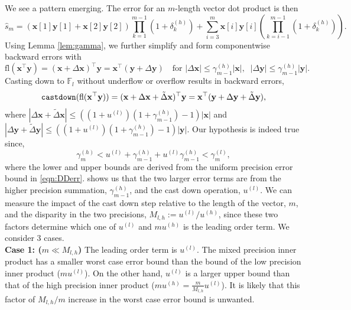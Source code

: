 \documentclass[review,onefignum,onetabnum]{siamart190516}
\newcommand{\F}{\mathbb{F}}
\newcommand{\dd}{\delta}
\newcommand{\bb}[1]{\mathbf{#1}}
\newcommand{\fl}{\mathrm{fl}}
\begin{document}
We see a pattern emerging. 
The error for an $m$-length vector dot product is then
\begin{equation}
\label{eqn:dperr_2}
\hat{s}_m = (\bb{x}[1]\bb{y}[1]+\bb{x}[2]\bb{y}[2])\prod_{k=1}^{m-1}(1+\dd_{k}^{(h)}) + \sum_{i=3}^m \bb{x}[i]\bb{y}[i]\left(\prod_{k=i-1}^{m-1}(1+\dd_{k}^{(h)})\right).
\end{equation}
Using Lemma \ref{lem:gamma}, we further simplify and form componentwise backward errors with
\begin{equation}
\fl(\bb{x}^{\top}\bb{y}) =(\bb{x}+\Delta\bb{x})^{\top}\bb{y} = \bb{x}^{\top}(\bb{y}+\Delta\bb{y})\quad\text{for }|\Delta \bb{x}| \leq \gamma^{(h)}_{m-1}|\bb{x}|,\;\; |\Delta \bb{y}|  \leq \gamma_{m-1}^{(h)}|\bb{y}|. \label{eqn:beforecd}
\end{equation}
Casting down to $\F_l$ without underflow or overflow results in backward errors, 
\begin{equation}
\text{\tt castdown}(\fl(\bb{x}^{\top}\bb{y})) = (\bb{x}+\Delta\bb{x}+\tilde{\Delta}\bb{x})^{\top}\bb{y} = \bb{x}^{\top}(\bb{y}+\Delta\bb{y}+\tilde{\Delta}\bb{y}), \label{eqn:aftercd}
\end{equation}
where $|\Delta\bb{x} + \tilde{\Delta} \bb{x}| \leq ((1+u^{(l)})(1+\gamma_{m-1}^{(h)})-1)|\bb{x}|$ and $|\Delta\bb{y}+\tilde{\Delta} \bb{y}| \leq ((1+u^{(l)})(1+\gamma_{m-1}^{(h)})-1)|\bb{y}|$.
Our hypothesis is indeed true since,
\[\gamma_m^{(h)}<u^{(l)}+\gamma_{m-1}^{(h)}+u^{(l)}\gamma_{m-1}^{(h)}<\gamma_{m}^{(l)},\]
where the lower and upper bounds are derived from the uniform precision error bound in \cref{eqn:DDerr}. 
 shows us that the two larger error terms are from the higher precision summation, $\gamma_{m-1}^{(h)}$, and the cast down operation, $u^{(l)}$.
We can measure the impact of the cast down step relative to the length of the vector, $m$, and the disparity in the two precisions, $M_{l,h}:=u^{(l)}/u^{(h)}$, since these two factors determine which one of $u^{(l)}$ and $mu^{(h)}$ is the leading order term. 
We consider 3 cases.\\
\textbf{Case 1: ($m\ll M_{l,h}$)} The leading order term is $u^{(l)}$.
The mixed precision inner product has a smaller worst case error bound than the bound of the low precision inner product ($mu^{(l)}$).
On the other hand, $u^{(l)}$ is a larger upper bound than that of the high precision inner product ($mu^{(h)}=\frac{m}{M_{l,h}}u^{(l)}$).
It is likely that this factor of $M_{l,h}/m$ increase in the worst case error bound is unwanted.
\end{document}
